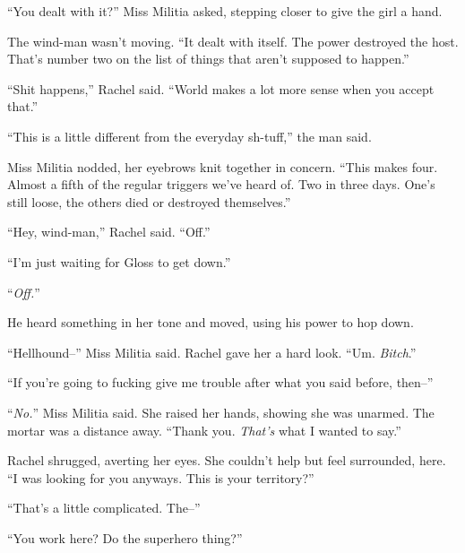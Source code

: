 ``You dealt with it?''  Miss Militia asked, stepping closer to give the girl a hand.



The wind-man wasn't moving.  ``It dealt with itself.  The power destroyed the host.  That's number two on the list of things that aren't supposed to happen.''



``Shit happens,'' Rachel said.  ``World makes a lot more sense when you accept that.''



``This is a little different from the everyday sh-tuff,'' the man said.



Miss Militia nodded, her eyebrows knit together in concern.  ``This makes four.  Almost a fifth of the regular triggers we've heard of.  Two in three days.  One's still loose, the others died or destroyed themselves.''



``Hey, wind-man,'' Rachel said.  ``Off.''



``I'm just waiting for Gloss to get down.''



``\emph{Off.}''



He heard something in her tone and moved, using his power to hop down.



``Hellhound--'' Miss Militia said.  Rachel gave her a hard look.   ``Um.  \emph{Bitch}.''



``If you're going to fucking give me trouble after what you said before, then--''



``\emph{No.}''  Miss Militia said.  She raised her hands, showing she was unarmed.  The mortar was a distance away.  ``Thank you.  \emph{That's} what I wanted to say.''



Rachel shrugged, averting her eyes.  She couldn't help but feel surrounded, here.  ``I was looking for you anyways.  This is your territory?''



``That's a little complicated.  The--''



``You work here?  Do the superhero thing?''



